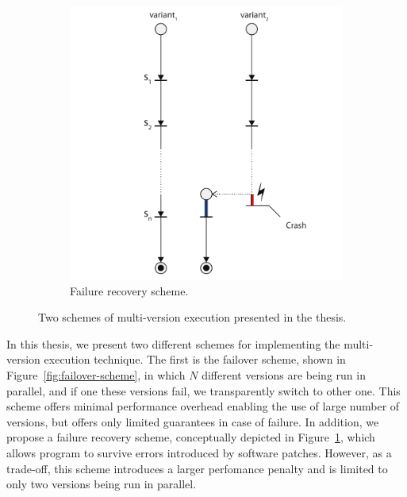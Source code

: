 \begin{figure}[t]
\begin{subfigure}[b]{0.5\textwidth}
    \includegraphics[width=\textwidth]{overview/figures/failrecovery}
    \caption{Failure recovery scheme.}
    \label{fig:failrecovery-scheme}
  \end{subfigure}
  \caption{Two schemes of multi-version execution presented in the thesis.}
  \label{fig:mvx-schemes}
\end{figure}

In this thesis, we present two different schemes for implementing the
multi-version execution technique. The first is the failover scheme, shown in
Figure~\ref{fig:failover-scheme}, in which $N$ different versions are being run
in parallel, and if one these versions fail, we transparently switch to other
one. This scheme offers minimal performance overhead enabling the use of large
number of versions, but offers only limited guarantees in case of failure.  In
addition, we propose a failure recovery scheme, conceptually depicted in
Figure~\ref{fig:failrecovery-scheme}, which allows program to survive errors
introduced by software patches. However, as a trade-off, this scheme introduces
a larger perfomance penalty and is limited to only two versions being run in
parallel.

